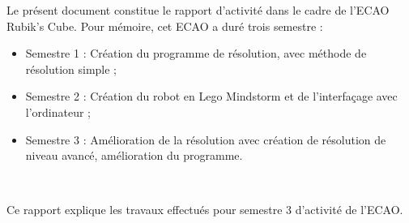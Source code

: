     Le présent document constitue le rapport d'activité dans le cadre de l'ECAO Rubik's Cube. Pour mémoire, cet ECAO a duré trois semestre :
    \begin{itemize}
    \item Semestre 1 : Création du programme de résolution, avec méthode de résolution simple ;
	\item Semestre 2 : Création du robot en Lego Mindstorm et de l'interfaçage avec l'ordinateur ;
	\item Semestre 3 : Amélioration de la résolution avec création de résolution de niveau avancé, amélioration du programme.
	\end{itemize}
	
	~
	
	Ce rapport explique les travaux effectués pour semestre 3 d'activité de l'ECAO.
